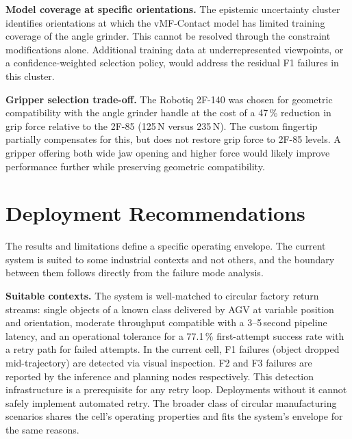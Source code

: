 \documentclass[12pt, a4paper]{report}
\begin{document}

\textbf{Model coverage at specific orientations.} The epistemic uncertainty cluster identifies orientations at which the vMF-Contact model has limited training coverage of the angle grinder. This cannot be resolved through the constraint modifications alone. Additional training data at underrepresented viewpoints, or a confidence-weighted selection policy, would address the residual F1 failures in this cluster.

\textbf{Gripper selection trade-off.} The Robotiq 2F-140 was chosen for geometric compatibility with the angle grinder handle at the cost of a 47\,\% reduction in grip force relative to the 2F-85 (125\,N versus 235\,N). The custom fingertip partially compensates for this, but does not restore grip force to 2F-85 levels. A gripper offering both wide jaw opening and higher force would likely improve performance further while preserving geometric compatibility.

\section{Deployment Recommendations}
\label{sec:deployment-recommendations}

The results and limitations define a specific operating envelope. The current system is suited to some industrial contexts and not others, and the boundary between them follows directly from the failure mode analysis.

\textbf{Suitable contexts.} The system is well-matched to circular factory return streams: single objects of a known class delivered by AGV at variable position and orientation, moderate throughput compatible with a 3--5\,second pipeline latency, and an operational tolerance for a 77.1\,\% first-attempt success rate with a retry path for failed attempts. In the current cell, F1 failures (object dropped mid-trajectory) are detected via visual inspection. F2 and F3 failures are reported by the inference and planning nodes respectively. This detection infrastructure is a prerequisite for any retry loop. Deployments without it cannot safely implement automated retry. The broader class of circular manufacturing scenarios shares the cell's operating properties and fits the system's envelope for the same reasons.
\end{document}
